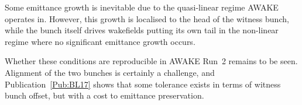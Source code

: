 Some emittance growth is inevitable due to the quasi-linear regime AWAKE operates in.
However, this growth is localised to the head of the witness bunch, while the bunch itself drives wakefields putting its own tail in the non-linear regime where no significant emittance growth occurs.

Whether these conditions are reproducible in AWAKE Run~2 remains to be seen.
Alignment of the two bunches is certainly a challenge, and Publication~\ref{Pub:BL17} shows that some tolerance exists in terms of witness bunch offset, but with a cost to emittance preservation.
